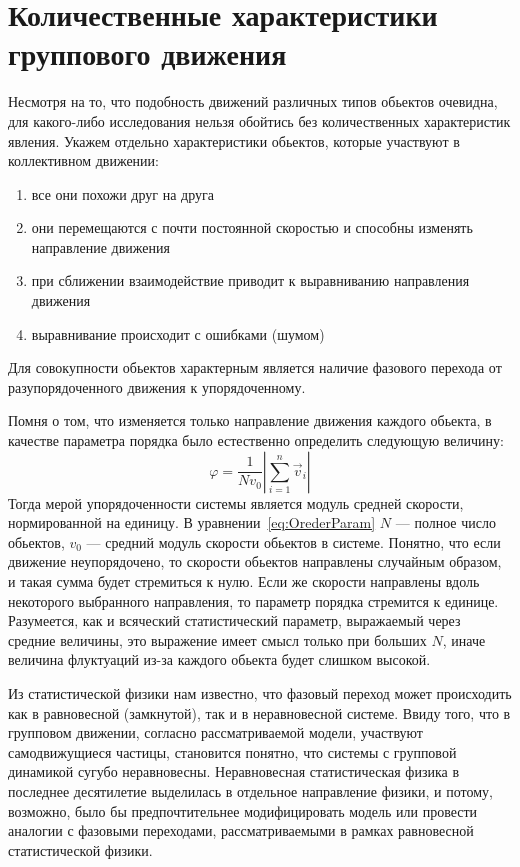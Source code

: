 \section{Количественные характеристики группового движения} %
\label{sec:NumericalCharacteristicsCollMot}
    Несмотря на то, что подобность движений различных типов обьектов очевидна, для какого-либо исследования нельзя обойтись без количественных характеристик явления.
    Укажем отдельно характеристики обьектов, которые участвуют в коллективном движении:
    \begin{enumerate}
        \item все они похожи друг на друга
        \item они перемещаются с почти постоянной скоростью и способны изменять направление движения
        \item при сближении взаимодействие приводит к выравниванию направления движения
        \item выравнивание происходит с ошибками (шумом)
    \end{enumerate}

    Для совокупности обьектов характерным является наличие фазового перехода от разупорядоченного движения к упорядоченному.

    Помня о том, что изменяется только направление движения каждого обьекта, в качестве параметра порядка было естественно определить следующую величину:
    \begin{equation}\label{eq:OrederParam}
        \varphi = \frac{1}{N v_0} |{\sum\limits_{i=1}^n \vec{v}_i}|
    \end{equation}
    Тогда мерой упорядоченности системы является модуль средней скорости, нормированной на единицу. В уравнении~\ref{eq:OrederParam} $N$ --- полное число обьектов, $v_0$ --- средний модуль скорости обьектов в системе. Понятно, что если движение неупорядочено, то скорости обьектов направлены случайным образом, и такая сумма будет стремиться к нулю. Если же скорости направлены вдоль некоторого выбранного направления, то параметр порядка стремится к единице. Разумеется, как и всяческий статистический параметр, выражаемый через средние величины, это выражение имеет смысл только при больших $N$, иначе величина флуктуаций из-за каждого обьекта будет слишком высокой.

    Из статистической физики нам известно, что фазовый переход может происходить как в равновесной (замкнутой), так и в неравновесной системе. Ввиду того, что в групповом движении, согласно рассматриваемой модели, участвуют самодвижущиеся частицы, становится понятно, что системы с групповой динамикой сугубо неравновесны. Неравновесная статистическая физика в последнее десятилетие выделилась в отдельное направление физики, и потому, возможно, было бы предпочтительнее модифицировать модель или провести аналогии с фазовыми переходами, рассматриваемыми в рамках равновесной статистической физики.~\cite{vicsek2012}

